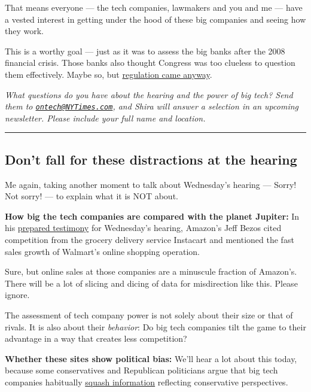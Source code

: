 That means everyone --- the tech companies, lawmakers and you and me ---
have a vested interest in getting under the hood of these big companies
and seeing how they work.

This is a worthy goal --- just as it was to assess the big banks after
the 2008 financial crisis. Those banks also thought Congress was too
clueless to question them effectively. Maybe so, but
\href{https://www.nytimes3xbfgragh.onion/2010/07/16/business/16regulate.html}{regulation
came anyway}.

\emph{What questions do you have about the hearing and the power of big
tech? Send them to
\href{mailto:ontech@NYTimes.com}{\nolinkurl{ontech@NYTimes.com}}, and
Shira will answer a selection in an upcoming newsletter. Please include
your full name and location.}

\begin{center}\rule{0.5\linewidth}{\linethickness}\end{center}

\hypertarget{dont-fall-for-these-distractions-at-the-hearing}{%
\subsection{Don't fall for these distractions at the
hearing}\label{dont-fall-for-these-distractions-at-the-hearing}}

Me again, taking another moment to talk about Wednesday's hearing ---
Sorry! Not sorry! --- to explain what it is NOT about.

\textbf{How big the tech companies are compared with the planet
Jupiter:} In his
\href{https://docs.house.gov/meetings/JU/JU05/20200729/110883/HHRG-116-JU05-Wstate-BezosJ-20200729.pdf}{prepared
testimony} for Wednesday's hearing, Amazon's Jeff Bezos cited
competition from the grocery delivery service Instacart and mentioned
the fast sales growth of Walmart's online shopping operation.

Sure, but online sales at those companies are a minuscule fraction of
Amazon's. There will be a lot of slicing and dicing of data for
misdirection like this. Please ignore.

The assessment of tech company power is not solely about their size or
that of rivals. It is also about their \emph{behavior}: Do big tech
companies tilt the game to their advantage in a way that creates less
competition?

\textbf{Whether these sites show political bias:} We'll hear a lot about
this today, because some conservatives and Republican politicians argue
that big tech companies habitually
\href{https://www.nytimes3xbfgragh.onion/2019/05/15/us/donald-trump-twitter-facebook-youtube.html}{squash
information} reflecting conservative perspectives.

